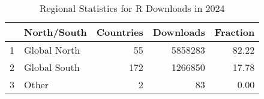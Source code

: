 \begin{table}[ht]
\centering
\begin{tabular}{rlrrr}
  \hline
 & North/South & Countries & Downloads & Fraction \\ 
  \hline
1 & Global North &  55 & 5858283 & 82.22 \\ 
  2 & Global South & 172 & 1266850 & 17.78 \\ 
  3 & Other &   2 &  83 & 0.00 \\ 
   \hline
\end{tabular}
\caption{Regional Statistics for R Downloads in 2024} 
\label{tab:r_downloads_global_stats_2024}
\end{table}
